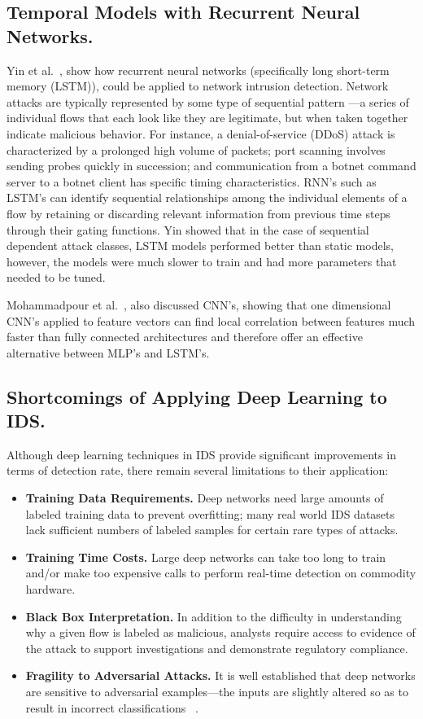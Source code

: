 \subsection{Temporal Models with Recurrent Neural Networks.}

Yin et al.~\cite{yin2017rnn}, show how recurrent neural networks (specifically long short-term memory (LSTM)), could be applied to network intrusion detection. Network attacks are typically represented by some type of sequential pattern ---a series of individual flows that each look like they are legitimate, but when taken together indicate malicious behavior. For instance, a denial-of-service (DDoS) attack is characterized by a prolonged high volume of packets; port scanning involves sending probes quickly in succession; and communication from a botnet command server to a botnet client has specific timing characteristics. RNN's such as LSTM's can identify sequential relationships among the individual elements of a flow by retaining or discarding relevant information from previous time steps through their gating functions. Yin showed that in the case of sequential dependent attack classes, LSTM models performed better than static models, however, the models were much slower to train and had more parameters that needed to be tuned.

Mohammadpour et al.~\cite{mohammadpour2022cnn}, also discussed CNN's, showing that one dimensional CNN's applied to feature vectors can find local correlation between features much faster than fully connected architectures and therefore offer an effective alternative between MLP's and LSTM's.

\subsection{Shortcomings of Applying Deep Learning to IDS. }

Although deep learning techniques in IDS provide significant improvements in terms of detection rate, there remain several limitations to their application:
\begin{itemize}
\item \textbf{Training Data Requirements. }Deep networks need large amounts of labeled training data to prevent overfitting; many real world IDS datasets lack sufficient numbers of labeled samples for certain rare types of attacks.
\item \textbf{Training Time Costs. }Large deep networks can take too long to train and/or make too expensive calls to perform real-time detection on commodity hardware.
\item \textbf{Black Box Interpretation. }In addition to the difficulty in understanding why a given flow is labeled as malicious, analysts require access to evidence of the attack to support investigations and demonstrate regulatory compliance.
\item \textbf{Fragility to Adversarial Attacks. }It is well established that deep networks are sensitive to adversarial examples---the inputs are slightly altered so as to result in incorrect classifications ~\cite{tafreshian2025adv}.
\end{itemize}

